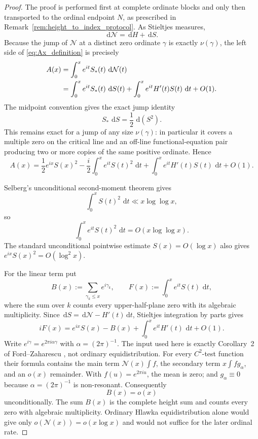 \documentclass[11pt]{amsart}
\numberwithin{equation}{section}
\theoremstyle{definition}
\theoremstyle{remark}
\newcommand{\dd}{\,\mathrm d}
\begin{document}
\begin{proof}
The proof is performed first at complete ordinate blocks and only then transported to the ordinal endpoint \(N\), as prescribed in Remark~\ref{rem:height_to_index_protocol}. As Stieltjes measures,
\[
\dd\mathcal N=\dd H+\dd S.
\]
Because the jump of \(\mathcal N\) at a distinct zero ordinate \(\gamma\) is exactly \(\nu(\gamma)\), the left side of \eqref{eq:Ax_definition} is precisely
\begin{align}
A(x)
&=\int_0^x e^{it}S_*(t)\,\dd\mathcal N(t)\notag\\
&=\int_0^x e^{it}S_*(t)\,\dd S(t)
 +\int_0^x e^{it}H'(t)S(t)\,\dd t+O(1).
\label{eq:Adecomp}
\end{align}
The midpoint convention gives the exact jump identity
\[
S_*\,\dd S=\frac12\,\dd(S^2).
\]
This remains exact for a jump of any size \(\nu(\gamma)\): in particular it covers a multiple zero on the critical line and an off-line functional-equation pair producing two or more copies of the same positive ordinate. Hence
\begin{equation}\label{eq:Aibp}
A(x)=
\frac12e^{ix}S(x)^2
-\frac{i}{2}\int_0^x e^{it}S(t)^2\,\dd t
+\int_0^x e^{it}H'(t)S(t)\,\dd t
+O(1).
\end{equation}

Selberg's unconditional second-moment theorem gives
\begin{equation}\label{eq:Selberg2}
\int_0^x S(t)^2\,\dd t\ll x\log\log x,
\end{equation}
so
\[
\int_0^x e^{it}S(t)^2\,\dd t=O(x\log\log x).
\]
The standard unconditional pointwise estimate \(S(x)=O(\log x)\) also gives \(e^{ix}S(x)^2=O(\log^2x)\).

For the linear term put
\begin{equation}\label{eq:Bheight_Fheight}
B(x):=\sum_{\gamma_k\le x}e^{i\gamma_k},
\qquad
F(x):=\int_0^x e^{it}S(t)\,\dd t,
\end{equation}
where the sum over \(k\) counts every upper-half-plane zero with its algebraic multiplicity. Since \(\dd S=\dd\mathcal N-H'(t)\dd t\), Stieltjes integration by parts gives
\begin{equation}\label{eq:Fidentity}
iF(x)
=e^{ix}S(x)-B(x)+\int_0^x e^{it}H'(t)\,\dd t+O(1).
\end{equation}
Write \(e^{i\gamma}=e^{2\pi i\alpha\gamma}\) with \(\alpha=(2\pi)^{-1}\). The input used here is exactly Corollary~2 of Ford--Zaharescu \cite{FordZaharescu2005}, not ordinary equidistribution. For every \(C^2\)-test function their formula contains the main term \(\mathcal N(x)\int f\), the secondary term \(x\int f g_\alpha\), and an \(o(x)\) remainder. With \(f(u)=e^{2\pi iu}\), the mean is zero; and \(g_\alpha\equiv0\) because \(\alpha=(2\pi)^{-1}\) is non-resonant. Consequently
\begin{equation}\label{eq:Bx_o_x}
B(x)=o(x)
\end{equation}
unconditionally. The sum \(B(x)\) is the complete height sum and counts every zero with algebraic multiplicity. Ordinary Hlawka equidistribution alone would give only \(o(\mathcal N(x))=o(x\log x)\) and would not suffice for the later ordinal rate.


\end{proof}
\end{document}
